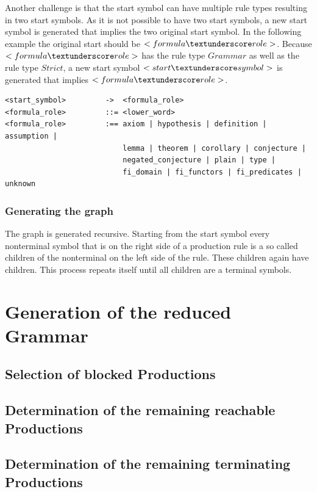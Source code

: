 Another challenge is that the start symbol can have multiple rule types resulting in two start symbols. As it is not possible to have two start symbols, a new start symbol is generated that implies the two original start symbol. In the following example the original start should be $<formula\textunderscore role>$. Because $<formula\textunderscore role>$ has the rule type $Grammar$ as well as the rule type $Strict$, a new start symbol $<start\textunderscore symbol>$ is generated that implies $<formula\textunderscore role>$.
\\
\begin{lstlisting}[basicstyle=\scriptsize	,caption= Example of replacing the start symbol,label= lst:GraphGeneration_RaplacingStartsymbol]
<start_symbol>		   ->  <formula_role>
<formula_role>         ::= <lower_word>
<formula_role>         :== axiom | hypothesis | definition | assumption |
                           lemma | theorem | corollary | conjecture |
                           negated_conjecture | plain | type |
                           fi_domain | fi_functors | fi_predicates | unknown
\end{lstlisting}

\subsubsection{Generating the graph}
The graph is generated recursive. Starting from the start symbol every nonterminal symbol that is on the right side of a production rule is a so called children of the nonterminal on the left side of the rule. These children again have children. This process repeats itself until all children are a terminal symbols.

\section{Generation of the reduced Grammar}\label{sec:ConceptGenerateReducedGrammar}

\subsection{Selection of blocked Productions}

\subsection{Determination of the remaining reachable Productions}

\subsection{Determination of the remaining terminating Productions}

